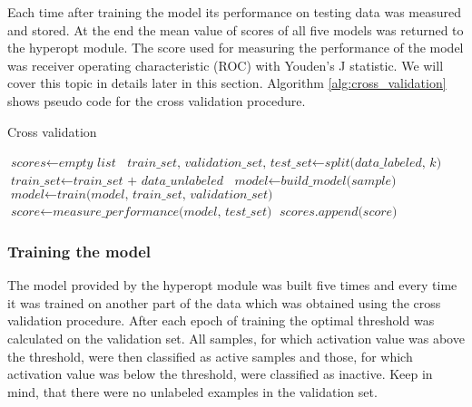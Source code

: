 \documentclass[a4paper,10pt]{report}
\begin{document}
	Each time after training the model its performance on testing data was measured and stored. At the end the mean value of scores of all five models was returned to the hyperopt module. The score used for measuring the performance of the model was receiver operating characteristic (ROC) with Youden's J statistic. We will cover this topic in details later in this section. Algorithm \ref{alg:cross_validation} shows pseudo code for the cross validation procedure.\\
	
	\begin{algorithm}
	\caption{Cross validation}\label{alg:cross_validation}
	\begin{algorithmic}[1]
	\State
	\State $\textit{scores} \gets \textit{empty list}$
	\State
	  \State $\textit{train\_set, validation\_set, test\_set} \gets \textit{split(data\_labeled, k)} $
	  \State $\textit{train\_set} \gets \textit{train\_set + data\_unlabeled}$
	  \State $\textit{model} \gets \textit{build\_model(sample)}$
	  \State $\textit{model} \gets \textit{train(model, train\_set, validation\_set)}$
	  \State $\textit{score} \gets \textit{measure\_performance(model, test\_set)}$
	  \State $\textit{scores.append(score)}$
	\EndFor
	\State       
	\State
	\EndProcedure
	\end{algorithmic}
	\end{algorithm}
	
	\subsubsection{Training the model}
	The model provided by the hyperopt module was built five times and every time it was trained on another part of the data which was obtained using the cross validation procedure. After each epoch of training the optimal threshold was calculated on the validation set. All samples, for which activation value was above the threshold, were then classified as active samples and those, for which activation value was below the threshold, were classified as inactive. Keep in mind, that there were no unlabeled examples in the validation set.\\
	
\end{document}
